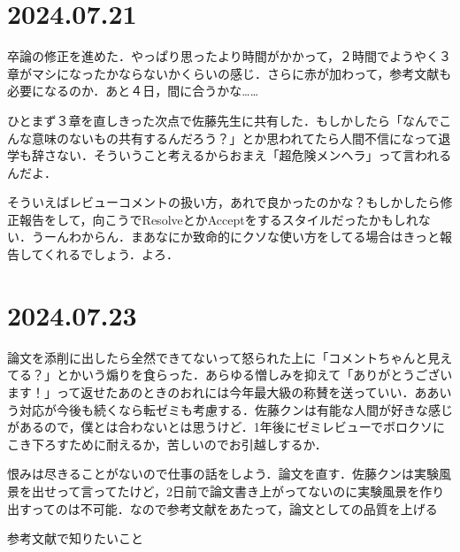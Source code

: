 \documentclass[fleqn,twocolumn]{mynote}
\begin{document}
  \section*{2024.07.21}
  卒論の修正を進めた．やっぱり思ったより時間がかかって，２時間でようやく３章がマシになったかならないかくらいの感じ．さらに赤が加わって，参考文献も必要になるのか．あと４日，間に合うかな……

  ひとまず３章を直しきった次点で佐藤先生に共有した．もしかしたら「なんでこんな意味のないもの共有するんだろう？」とか思われてたら人間不信になって退学も辞さない．そういうこと考えるからおまえ「超危険メンヘラ」って言われるんだよ．

  そういえばレビューコメントの扱い方，あれで良かったのかな？もしかしたら修正報告をして，向こうでResolveとかAcceptをするスタイルだったかもしれない．うーんわからん．まあなにか致命的にクソな使い方をしてる場合はきっと報告してくれるでしょう．よろ．

  \section*{2024.07.23}
  論文を添削に出したら全然できてないって怒られた上に「コメントちゃんと見えてる？」とかいう煽りを食らった．あらゆる憎しみを抑えて「ありがとうございます！」って返せたあのときのおれには今年最大級の称賛を送っていい．ああいう対応が今後も続くなら転ゼミも考慮する．佐藤クンは有能な人間が好きな感じがあるので，僕とは合わないとは思うけど．1年後にゼミレビューでボロクソにこき下ろすために耐えるか，苦しいのでお引越しするか．

  恨みは尽きることがないので仕事の話をしよう．論文を直す．佐藤クンは実験風景を出せって言ってたけど，2日前で論文書き上がってないのに実験風景を作り出すってのは不可能．なので参考文献をあたって，論文としての品質を上げる

  参考文献で知りたいこと
\end{document}
